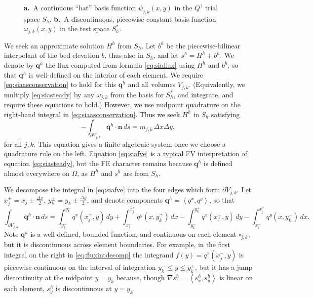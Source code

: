 \documentclass[11pt]{amsart}
\newcommand\bn{\mathbf{n}}
\newcommand\bq{\mathbf{q}}
\newcommand{\grad}{\nabla}
\newcommand{\ip}[2]{\ensuremath{\left<#1,#2\right>}}
\newcommand{\dxtwo}{\tfrac{\Delta x}{2}}
\newcommand{\dytwo}{\tfrac{\Delta y}{2}}
\begin{document}
\begin{figure}[ht]
\begin{center}
 \quad 
\end{center}
\caption{{\large \textbf{a.}}~A continuous ``hat'' basis function $\psi_{j,k}(x,y)$ in the $Q^1$ trial space $S_h$.  {\large \textbf{b.}}~A discontinuous, piecewise-constant basis function $\omega_{j,k}(x,y)$ in the test space $S_h^*$.}
\label{fig:fembases}
\end{figure}

We seek an approximate solution $H^h$ from $S_h$.  Let $b^h$ be the piecewise-bilinear interpolant of the bed elevation $b$, thus also in $S_h$, and let $s^h=H^h+b^h$.  We denote by $\bq^h$ the flux computed from formula \eqref{eq:siaflux} using $H^h$ and $b^h$, so that $\bq^h$ is well-defined on the interior of each element.  We require \eqref{eq:siaasconservation} to hold for this $\bq^h$ and all volumes $V_{j,k}$.  (Equivalently, we multiply \eqref{eq:siasteady} by any $\omega_{j,k}$ from the basis for $S_h^*$, and integrate, and require these equations to hold.)  However, we use midpoint quadrature on the right-hand integral in \eqref{eq:siaasconservation}.  Thus we seek $H^h$ in $S_h$ satisfying
\begin{equation}
  - \int_{\partial V_{j,k}} \bq^h \cdot \bn\,ds = m_{j,k}\, \Delta x \Delta y, \label{eq:siafve}
\end{equation}
for all $j,k$.  This equation gives a finite algebraic system once we choose a quadrature rule on the left.  Equation \eqref{eq:siafve} is a typical FV interpretation of equation \eqref{eq:siasteady}, but the FE character remains because $\bq^h$ is defined almost everywhere on $\Omega$, as $H^h$ and $s^h$ are from $S_h$.

We decompose the integral in \eqref{eq:siafve} into the four edges which form $\partial V_{j,k}$.  Let $x_j^\pm = x_j \pm \dxtwo$, $y_k^\pm = y_k \pm \dytwo$, and denote components $\bq^h = \ip{q^x}{q^y}$, so that
\begin{equation}
  \int_{\partial V_{j,k}} \bq^h \cdot \bn\,ds = \int_{y_k^-}^{y_k^+} q^x(x_j^+,y)\,dy + \int_{x_j^-}^{x_j^+} q^y(x,y_k^+)\,dx - \int_{y_k^-}^{y_k^+} q^x(x_j^-,y)\,dy - \int_{x_j^-}^{x_j^+} q^y(x,y_k^-)\,dx. \label{eq:fluxintdecomp}
\end{equation}
Note $\bq^h$ is a well-defined, bounded function, and continuous on each element $\square_{j,k}$, but it is discontinuous across element boundaries.  For example, in the first integral on the right in \eqref{eq:fluxintdecomp} the integrand $f(y) = q^x(x_j^+,y)$ is piecewise-continuous on the interval of integration $y_k^- \le y \le y_k^+$, but it has a jump discontinuity at the midpoint $y=y_k$ because, though $\grad s^h = \ip{s^h_x}{s^h_y}$ is linear on each element, $s^h_y$ is discontinuous at $y=y_k$.
\end{document}

